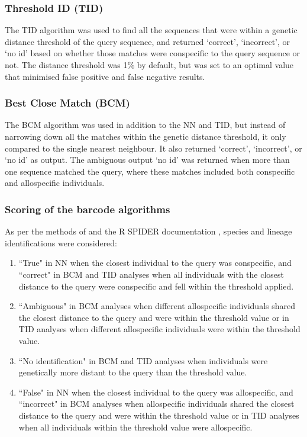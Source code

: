 \subsubsection{Threshold ID (TID)}
The TID algorithm was used to find all the sequences that were within a genetic distance threshold of the query sequence, and returned `correct', `incorrect', or `no id' based on whether those matches were conspecific to the query sequence or not. The distance threshold was 1\% by default, but was set to an optimal value that minimised false positive and false negative results. 

\subsubsection{Best Close Match (BCM)}
The BCM algorithm was used in addition to the NN and TID, but instead of narrowing down all the matches within the genetic distance threshold, it only compared to the single nearest neighbour. It also returned `correct', `incorrect', or `no id' as output. The ambiguous output `no id' was returned when more than one sequence matched the query, where these matches included both conspecific and allospecific individuals. 
\subsubsection{Scoring of the barcode algorithms}
As per the methods of \citet{Birch2017TestingAustralia} and the R SPIDER documentation \citep{Brown2012Spider:Barcoding}, species and lineage identifications were considered: 
\vspace{0.4cm}

\begin{enumerate}
    \item ``True" in NN when the closest individual to the query was conspecific,  and ``correct" in BCM and TID analyses when all individuals with the closest distance to the query were conspecific and fell within the threshold applied.
    \item ``Ambiguous" in BCM analyses when different allospecific individuals shared the closest distance to the query and were within the threshold value or in TID analyses when different allospecific individuals were within the threshold value.
    \item ``No identification" in BCM and TID analyses when individuals were genetically more distant to the query than the threshold value.
    \item ``False" in NN when the closest individual to the query was allospecific, and ``incorrect" in BCM analyses when allospecific individuals shared the closest distance to the query and were within the threshold value or in TID analyses when all individuals within the threshold value were allospecific.
\end{enumerate}
\vspace{0.4cm}

